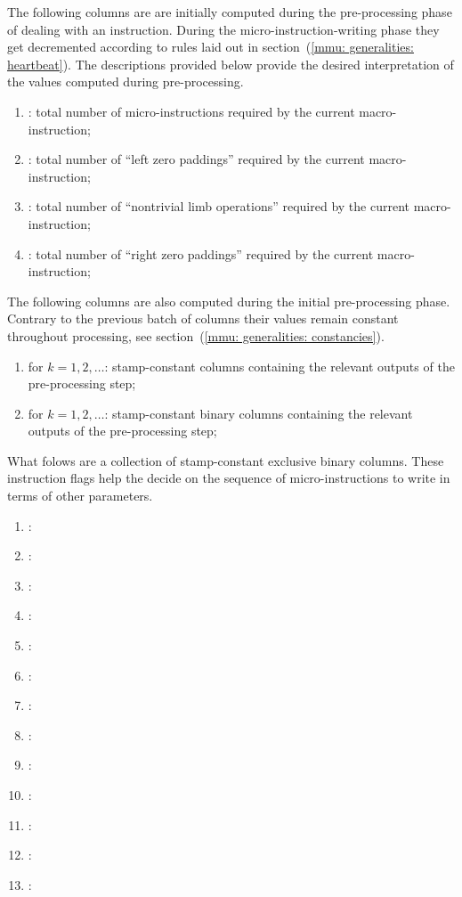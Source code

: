 The following columns are are initially computed during the pre-processing phase of dealing with an \mmuMod{} instruction.
During the micro-instruction-writing phase they get decremented according to rules laid out in section~(\ref{mmu: generalities: heartbeat}).
The descriptions provided below provide the desired interpretation of the values computed during pre-processing. 
\begin{enumerate}[resume]
	\item \ppTot:
		total number of micro-instructions required by the current macro-instruction;	
	\item \ppTotLZ:
		total number of ``left zero paddings'' required by the current macro-instruction;	
	\item \ppTotNT:
		total number of ``nontrivial limb operations'' required by the current macro-instruction;
	\item \ppTotRZ:
		total number of ``right zero paddings'' required by the current macro-instruction;	
\end{enumerate}
The following columns are also computed during the initial pre-processing phase.
Contrary to the previous batch of columns their values remain constant throughout processing, see section~(\ref{mmu: generalities: constancies}).
\begin{enumerate}[resume]
	\item {} for $k=1, 2, \dots$:
		stamp-constant columns containing the relevant outputs of the pre-processing step;
	\item {} for $k=1, 2, \dots$:
		stamp-constant binary columns containing the relevant outputs of the pre-processing step;
\end{enumerate}
What folows are a collection of stamp-constant exclusive binary columns.
These instruction flags help the \mmuMod{} decide on the sequence of micro-instructions to write in terms of other parameters. 
\begin{enumerate}[resume]
	\item \mmuInstFlagMload{}:
	\item \mmuInstFlagMstore{}:
	\item \mmuInstFlagMstoreEight{}:
	\item \mmuInstFlagInvalidCodePrefix{}:
	\item \mmuInstFlagRightPaddedWordExtraction{}:
	\item \mmuInstFlagRamToExoWithPadding{}:
	\item \mmuInstFlagExoToRamTransplants{}:
	\item \mmuInstFlagRamToRamSansPadding{}:
	\item \mmuInstFlagAnyToRamWithPaddingSomeData{}:
	\item \mmuInstFlagAnyToRamWithPaddingPurePadding{}:
	\item \mmuInstFlagModexpZero{}:
	\item \mmuInstFlagModexpData{}:
	\item \mmuInstFlagBlake{}:
\end{enumerate}
